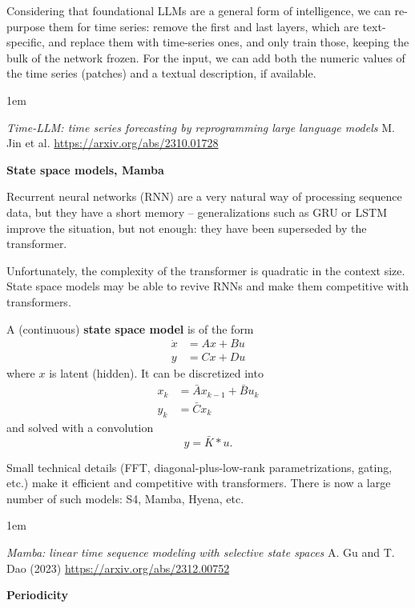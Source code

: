 \documentclass[a5paper]{article}
\let\d\textbf
\newenvironment{reference}{%
  \medskip\goodbreak
  \parskip 0pt
  \raggedright
  \leftskip 1em
  \obeylines
}{\par\medskip\goodbreak}
\def\subsection#1{{\par\bigskip\goodbreak\large\bfseries #1\par}}
\begin{document}
Considering that foundational LLMs are a general form of intelligence,
we can re-purpose them for time series: remove the first and last layers,
which are text-specific, and replace them with time-series ones,
and only train those, keeping the bulk of the network frozen.
For the input, we can add both the numeric values of the time series (patches)
and a textual description, if available.

\begin{reference}
  \emph{Time-LLM: time series forecasting by reprogramming large language models}
  M. Jin et al.
  \url{https://arxiv.org/abs/2310.01728}
\end{reference}

\subsection{State space models, Mamba}

Recurrent neural networks (RNN) are a very natural way of processing sequence data, but they have a short memory --
generalizations such as GRU or LSTM improve the situation, but not enough:
they have been superseded by the transformer.

Unfortunately, the complexity of the transformer is quadratic in the context size.
State space models may be able to revive RNNs
and make them competitive with transformers.

A (continuous) \d{state space model} is of the form
\begin{align*}
  \dot x &= Ax + Bu \\
  y &= Cx + Du
\end{align*}
where $x$ is latent (hidden).
It can be discretized into
\begin{align*}
  x_k &= \bar A x_{k-1} + \bar B u_k \\
  y_k &= \bar C x_k 
\end{align*}
and solved with a convolution
\[ y = \bar K * u. \]

Small technical details (FFT, diagonal-plus-low-rank parametrizations, gating, etc.) make it efficient and competitive with transformers.
There is now a large number of such models: S4, Mamba, Hyena, etc.

\begin{reference}
  \emph{Mamba: linear time sequence modeling with selective state spaces}
  A. Gu and T. Dao (2023)
  \url{https://arxiv.org/abs/2312.00752}
\end{reference}

\subsection{Periodicity}
\end{document}

